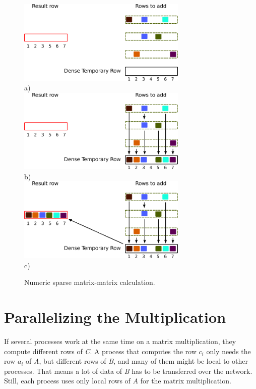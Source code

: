 \begin{figure}[H]
\centering
\includegraphics[width=0.72\textwidth]{spgemm-numeric-2}\\
a)\\
\vspace*{5mm}
\includegraphics[width=0.72\textwidth]{spgemm-numeric-4}\\
b)\\
\vspace*{5mm}
\includegraphics[width=0.72\textwidth]{spgemm-numeric-6}\\
c)\\
\vspace*{5mm}
\caption{Numeric sparse matrix-matrix calculation.}
\label{fig:spgemm-numeric}
\end{figure}


\section{Parallelizing the Multiplication}

If several processes work at the same time on a matrix multiplication, they compute different rows of \textit{C}. A process that computes the row $c_i$ only needs the row $a_i$ of \textit{A}, but different rows of \textit{B}, and many of them might be local to other processes. That means a lot of data of \textit{B} has to be transferred over the network. Still, each process uses only local rows of $A$ for the matrix multiplication.

